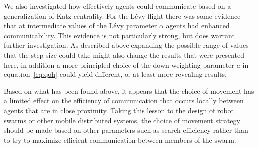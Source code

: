 \documentclass[conference]{IEEEtran}
\begin{document}
We also investigated how effectively agents could communicate based on
a generalization of Katz centrality. For the L\'evy flight there was
some evidence that at intermediate values of the L\'evy parameter
$\alpha$ agents had enhanced communicability. This evidence is not
particularly strong, but does warrant further investigation. As
described above expanding the possible range of values that the step
size could take might also change the results that were presented
here, in addition a more principled choice of the down-weighting
parameter $a$ in equation~\ref{eq:qoh} could yield different, or at
least more revealing results.

Based on what has been found above, it appears that the choice of
movement has a limited effect on the efficiency of communication that
occurs locally between agents that are in close proximity. Taking this
lesson to the design of robot swarms or other mobile distributed
systems, the choice of movement strategy should be made based on other
parameters such as search efficiency rather than to try to maximize
efficient communication between members of the swarm.

%
%

\end{document}
